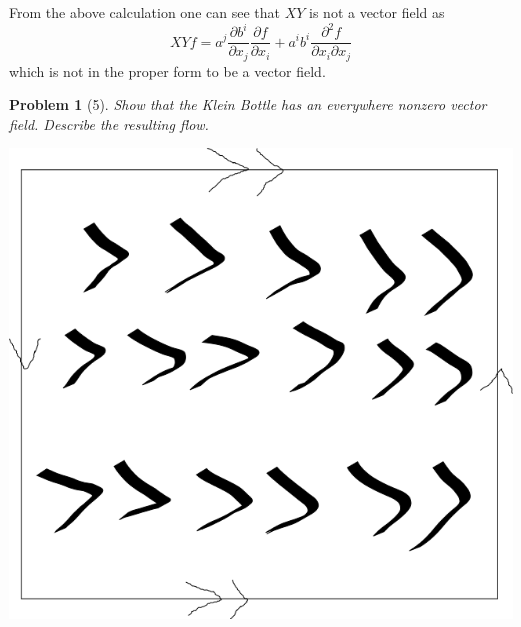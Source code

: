 \documentclass[10pt]{article}
\theoremstyle{plain}
\newtheorem{problem}{Problem}
\theoremstyle{remark}
\begin{document}
From the above calculation one can see that $XY$ is not a vector field as
\[
  XYf = a^j\frac{\partial b^i}{\partial x_j}\frac{\partial f}{\partial x_i}+a^ib^i\frac{\partial^2 f}{\partial x_i\partial x_j}
\]
which is not in the proper form to be a vector field.

\pagebreak

\begin{problem}[5]
  Show that the Klein Bottle has an everywhere nonzero vector field.
  Describe the resulting flow.
\end{problem}

\includegraphics[scale=.5]{klein}

\end{document}
